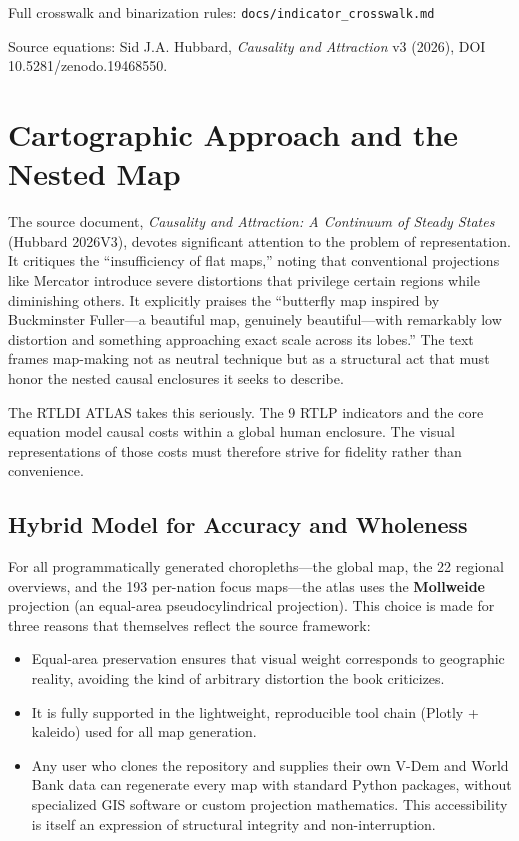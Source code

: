 \documentclass[11pt,a4paper]{book}
\begin{document}
Full crosswalk and binarization rules: \texttt{docs/indicator\_crosswalk.md}

Source equations: Sid J.A. Hubbard, \textit{Causality and Attraction} v3 (2026), DOI 10.5281/zenodo.19468550.

\chapter*{Cartographic Approach and the Nested Map}

The source document, \textit{Causality and Attraction: A Continuum of Steady States} (Hubbard 2026V3), devotes significant attention to the problem of representation. It critiques the ``insufficiency of flat maps,'' noting that conventional projections like Mercator introduce severe distortions that privilege certain regions while diminishing others. It explicitly praises the ``butterfly map inspired by Buckminster Fuller---a beautiful map, genuinely beautiful---with remarkably low distortion and something approaching exact scale across its lobes.'' The text frames map-making not as neutral technique but as a structural act that must honor the nested causal enclosures it seeks to describe.

The RTLDI ATLAS takes this seriously. The 9 RTLP indicators and the core equation model causal costs within a global human enclosure. The visual representations of those costs must therefore strive for fidelity rather than convenience.

\section*{Hybrid Model for Accuracy and Wholeness}

For all programmatically generated choropleths---the global map, the 22 regional overviews, and the 193 per-nation focus maps---the atlas uses the \textbf{Mollweide} projection (an equal-area pseudocylindrical projection). This choice is made for three reasons that themselves reflect the source framework:

\begin{itemize}
  \item Equal-area preservation ensures that visual weight corresponds to geographic reality, avoiding the kind of arbitrary distortion the book criticizes.
  \item It is fully supported in the lightweight, reproducible tool chain (Plotly + kaleido) used for all map generation.
  \item Any user who clones the repository and supplies their own V-Dem and World Bank data can regenerate every map with standard Python packages, without specialized GIS software or custom projection mathematics. This accessibility is itself an expression of structural integrity and non-interruption.
\end{itemize}
\end{document}
